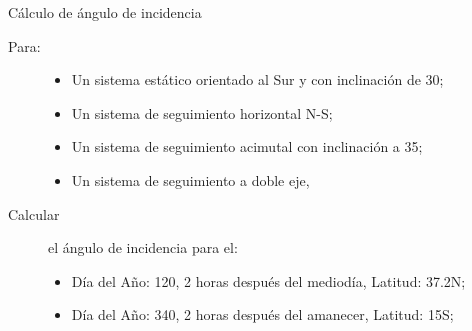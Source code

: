 \documentclass[xcolor={usenames,svgnames,dvipsnames}]{beamer}
\begin{document}
\begin{frame}[label=sec-2-2-10]{Cálculo de ángulo de incidencia}
\begin{description}
\item[{Para:}] \begin{itemize}
\item Un sistema estático orientado al Sur y con inclinación de 30;

\item Un sistema de seguimiento horizontal N-S;

\item Un sistema de seguimiento acimutal con inclinación a 35;

\item Un sistema de seguimiento a doble eje,
\end{itemize}

\item[{Calcular}] el ángulo de incidencia para el:

\begin{itemize}
\item Día del Año: 120, 2 horas después del mediodía, Latitud: 37.2N;

\item Día del Año: 340, 2 horas después del amanecer, Latitud: 15S;
\end{itemize}
\end{description}
\end{frame}
\end{document}
